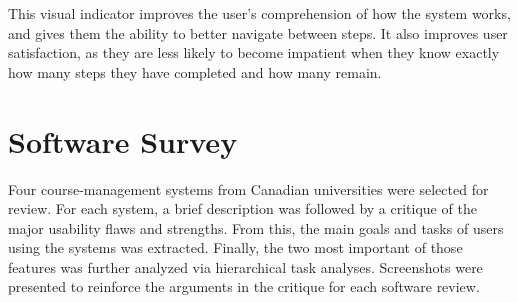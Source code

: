 \documentclass[10pt]{article}
\begin{document}
\begin{multicols}{2}
This visual indicator improves the user's comprehension of how the system 
works, and gives them the ability to better navigate between steps. It also improves user satisfaction, 
as they are less likely to become impatient when they know exactly 
how many steps they have completed and how many remain. 

\section*{Software Survey}
Four course-management systems from Canadian universities were selected for 
review. For each system, a brief description was followed by a critique of 
the major usability flaws and strengths. From this, the main goals and tasks of 
users using the systems was extracted. Finally, the two most important of 
those features was further analyzed via hierarchical task analyses. 
Screenshots were presented to reinforce the arguments in the critique for 
each software review.


\end{multicols}
\end{document}
